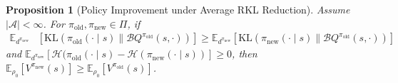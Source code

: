 \documentclass{article}
\newcommand{\Ex}{\mathbb{E}}
\newcommand{\actionspace}{\mathcal{A}}
\newcommand{\KL}{\mathrm{KL}}
\newcommand{\boltzmannQ}{\mathcal{B}Q}
\newcommand{\entropy}{\mathcal{H}}
\newcommand{\pinew}{{\pi_\mathrm{new}}}
\newcommand{\piold}{{\pi_\mathrm{old}}}
\newtheorem{proposition}{Proposition}
\begin{document}
\begin{proposition}[Policy Improvement under Average RKL Reduction]\label{prop:avg-reverse-kl}
Assume $|\actionspace| < \infty$. For $\piold, \pinew \in \Pi$, if
\begin{align}\label{eq:avg-rev-kl-policy-assumption}
    \Ex_{d^{\pinew}}&[\KL(\piold(\cdot \mid s) \parallel \boltzmannQ^{\piold}(s, \cdot))] \geq \Ex_{d^{\pinew}}[\KL(\pinew(\cdot \mid s) \parallel \boltzmannQ^{\piold}(s, \cdot))] \nonumber
\end{align}
and $\Ex_{d^{\pinew}}[\entropy(\piold(\cdot \mid s) - \entropy(\pinew(\cdot \mid s))] \geq 0$, then $\Ex_{\rho_0}[V^{\pinew}(s)] \geq \Ex_{\rho_0}[V^{\piold}(s)]$.
%
\end{proposition}
\end{document}
